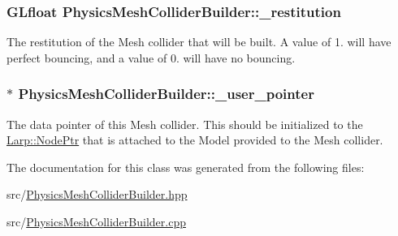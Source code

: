 \subsubsection[{\texorpdfstring{\+\_\+restitution}{_restitution}}]{\setlength{\rightskip}{0pt plus 5cm}G\+Lfloat Physics\+Mesh\+Collider\+Builder\+::\+\_\+restitution\hspace{0.3cm}{\ttfamily [private]}}\hypertarget{classPhysicsMeshColliderBuilder_afd9be67d71afcfedbb4a245e38db0947}{}\label{classPhysicsMeshColliderBuilder_afd9be67d71afcfedbb4a245e38db0947}
The restitution of the Mesh collider that will be built. A value of 1. will have perfect bouncing, and a value of 0. will have no bouncing. 
\subsubsection[{\texorpdfstring{\+\_\+user\+\_\+pointer}{_user_pointer}}]{$\ast$ Physics\+Mesh\+Collider\+Builder\+::\+\_\+user\+\_\+pointer\hspace{0.3cm}{\ttfamily [private]}}\hypertarget{classPhysicsMeshColliderBuilder_adef014a03eaa91a9006d50267d1068b3}{}\label{classPhysicsMeshColliderBuilder_adef014a03eaa91a9006d50267d1068b3}
The data pointer of this Mesh collider. This should be initialized to the \hyperlink{namespaceLarp_a171c1dc8b70cfb441b15d7386780db23}{Larp\+::\+Node\+Ptr} that is attached to the Model provided to the Mesh collider. 

The documentation for this class was generated from the following files\+:\begin{DoxyCompactItemize}
\item 
src/\hyperlink{PhysicsMeshColliderBuilder_8hpp}{Physics\+Mesh\+Collider\+Builder.\+hpp}\item 
src/\hyperlink{PhysicsMeshColliderBuilder_8cpp}{Physics\+Mesh\+Collider\+Builder.\+cpp}\end{DoxyCompactItemize}
